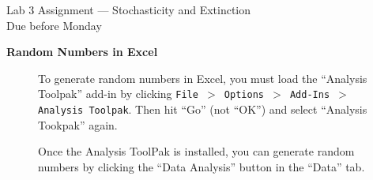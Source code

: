\documentclass[12pt]{article}\usepackage[]{graphicx}\usepackage[]{color}
\begin{document}
{
  \Large
  \centering
  Lab 3 Assignment --- Stochasticity and Extinction \\
  Due before Monday \par
}

{\bf Random Numbers in Excel \\}


\begin{figure}[h]
  \centering
  \caption{To generate random numbers in Excel, you must load the
    ``Analysis Toolpak'' add-in by clicking
    {\tt File $>$ Options $>$ Add-Ins $>$ Analysis Toolpak}. Then hit
    ``Go'' (not ``OK'') and select ``Analysis Tookpak'' again.}
  \label{fig:rng}
\end{figure}

\clearpage

\begin{figure}[h]
  \centering
  \caption{\footnotesize Once the Analysis ToolPak is installed, you can generate
    random numbers by clicking the ``Data Analysis'' button in the
    ``Data'' tab.}
  \label{fig:rng-2}
\end{figure}
\end{document}
